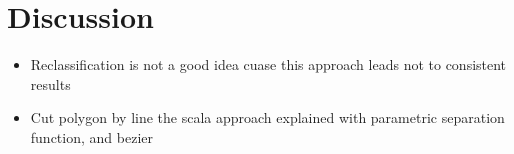 \chapter{Discussion}
\label{ch:discussion}
\begin{itemize}
	\item Reclassification is not a good idea cuase this approach leads not to consistent results
	\item Cut polygon by line the scala approach explained with parametric separation function, and bezier 
\end{itemize}